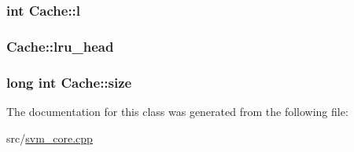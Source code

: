 \subsubsection[{l}]{\setlength{\rightskip}{0pt plus 5cm}int Cache\+::l\hspace{0.3cm}{\ttfamily [private]}}\hypertarget{classCache_a8f5881aa763cb4af5cfb7b6bda0cff35}{}\label{classCache_a8f5881aa763cb4af5cfb7b6bda0cff35}
\subsubsection[{lru\+\_\+head}]{ Cache\+::lru\+\_\+head\hspace{0.3cm}{\ttfamily [private]}}\hypertarget{classCache_a91fc6bd9c69ed37e8e0499da8d47794e}{}\label{classCache_a91fc6bd9c69ed37e8e0499da8d47794e}
\subsubsection[{size}]{\setlength{\rightskip}{0pt plus 5cm}long int Cache\+::size\hspace{0.3cm}{\ttfamily [private]}}\hypertarget{classCache_af50a89d0734a160cf812384df64599f9}{}\label{classCache_af50a89d0734a160cf812384df64599f9}


The documentation for this class was generated from the following file\+:\begin{DoxyCompactItemize}
\item 
src/\hyperlink{svm__core_8cpp}{svm\+\_\+core.\+cpp}\end{DoxyCompactItemize}
